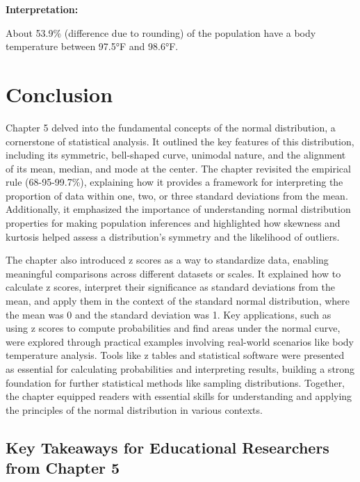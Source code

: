 \documentclass[
  letterpaper,
  DIV=11,
  numbers=noendperiod]{scrreprt}
\begin{document}
\textbf{Interpretation:}

About 53.9\% (difference due to rounding) of the population have a body
temperature between 97.5°F and 98.6°F.


\chapter*{Conclusion}\label{conclusion-4}


Chapter 5 delved into the fundamental concepts of the normal
distribution, a cornerstone of statistical analysis. It outlined the key
features of this distribution, including its symmetric, bell-shaped
curve, unimodal nature, and the alignment of its mean, median, and mode
at the center. The chapter revisited the empirical rule (68-95-99.7\%),
explaining how it provides a framework for interpreting the proportion
of data within one, two, or three standard deviations from the mean.
Additionally, it emphasized the importance of understanding normal
distribution properties for making population inferences and highlighted
how skewness and kurtosis helped assess a distribution's symmetry and
the likelihood of outliers.

The chapter also introduced z scores as a way to standardize data,
enabling meaningful comparisons across different datasets or scales. It
explained how to calculate z scores, interpret their significance as
standard deviations from the mean, and apply them in the context of the
standard normal distribution, where the mean was 0 and the standard
deviation was 1. Key applications, such as using z scores to compute
probabilities and find areas under the normal curve, were explored
through practical examples involving real-world scenarios like body
temperature analysis. Tools like z tables and statistical software were
presented as essential for calculating probabilities and interpreting
results, building a strong foundation for further statistical methods
like sampling distributions. Together, the chapter equipped readers with
essential skills for understanding and applying the principles of the
normal distribution in various contexts.

\section*{Key Takeaways for Educational Researchers from Chapter
5\,}\label{key-takeaways-for-educational-researchers-from-chapter-5}
\end{document}

